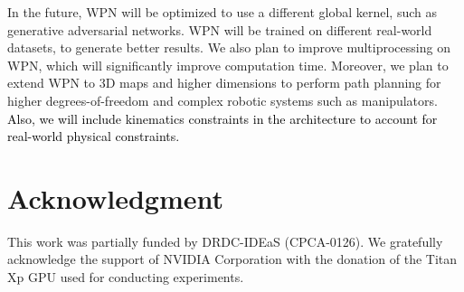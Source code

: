 \documentclass[journal, twocolumn]{IEEEtran}
\begin{document}
In the future, WPN will be optimized to use a different global kernel, such as generative adversarial networks. WPN will be trained on different real-world datasets, to generate better results. We also plan to improve multiprocessing on WPN, which will significantly improve computation time. Moreover, we plan to extend WPN to 3D maps and higher dimensions to perform path planning for higher degrees-of-freedom and complex robotic systems such as manipulators. \textcolor{black}{Also, we will include kinematics constraints in the architecture to account for real-world physical constraints.}


\section*{Acknowledgment}
This work was partially funded by DRDC-IDEaS (CPCA-0126). 
%
We gratefully acknowledge the support of NVIDIA Corporation with the donation of the Titan Xp GPU used for conducting experiments.




 
\end{document}
